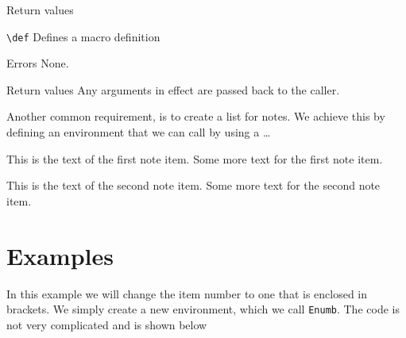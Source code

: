 \begin{definitions}{Return values}
\item[\texttt{\textbackslash def}] Defines a macro definition
\item[Errors]
None.
\item {Return values}
Any arguments in effect are passed back to the
caller.
\end{definitions}



Another common requirement, is to create a list for notes. We achieve this by defining an environment that we can call by using a 
 \ldots {}


\begin{teX}
\newenvironment{Notes}
{\begin{list}{\textsc{Note} \arabic{notes}.}%
    {\setlength\labelsep{10pt}%
    \setlength\itemindent{10pt}%
    \setlength\leftmargin{0pt}%
    \setlength\labelwidth{0pt}%
    \usecounter{notes}}}%
{\end{list}}
\end{teX}

\newenvironment{Notes}
{\begin{list}{\textsc{note} \roman{notes}.}%
    {\setlength\labelsep{10pt}%
    \setlength\itemindent{10pt}%
    \setlength\leftmargin{10pt}%
    \setlength{}%
    }}%
{\end{list}}

\begin{Notes}
\item This is the text of the first note item.
Some more text for the first note item.
\item This is the text of the second note item.
Some more text for the second note item.
\end{Notes}


\section{Examples}
\normalsize
In this example we will change the item number to one that is enclosed in brackets. We simply create a new environment, which we call  \texttt{Enumb}. The code is not very complicated and is shown below


\begin{teX}
\newenvironment{Enumb}
{\begin{list}{(\arabic{enumb})} 
    {\setlength\labelsep{10pt}%
    \setlength\itemindent{10pt}%
    \setlength\leftmargin{10pt}%
    \setlength\labelwidth{0pt}%
    \usecounter{enumb}}}%
{\end{list}}
\end{teX}



